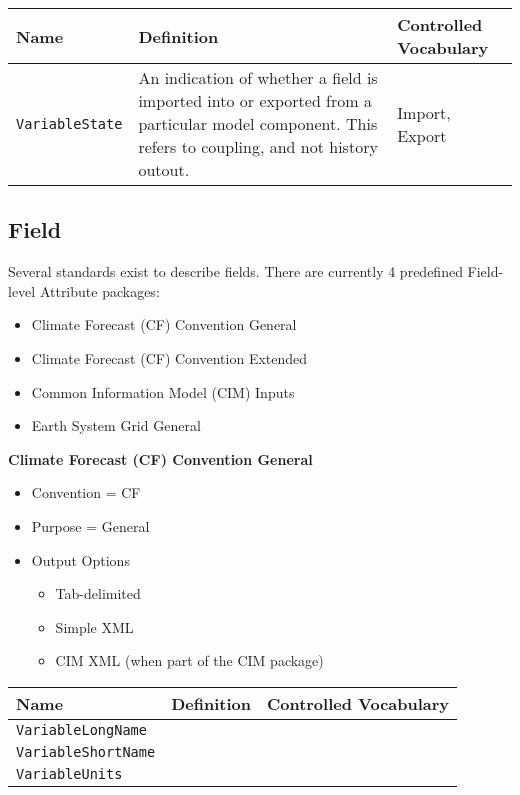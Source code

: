 \begin{tabular}{|p{8cm}|p{20cm}|p{10cm}|}
    {\bf Name } & {\bf Definition} & {\bf Controlled Vocabulary} \\
    \hline\hline
    {\tt VariableState} & An indication of whether a field is imported into or exported from a particular model component. This refers to coupling, and not history outout. & Import, Export \\
\end{tabular}



\subsection{Field}
\label{FieldAttributePackages}

Several standards exist to describe fields. There are currently 4 predefined Field-level Attribute packages:

\begin{itemize}
    \item Climate Forecast (CF) Convention General
    \item Climate Forecast (CF) Convention Extended
    \item Common Information Model (CIM) Inputs
    \item Earth System Grid General

\end{itemize}


{\bf Climate Forecast (CF) Convention General}

\begin{itemize}
    \item Convention = CF
    \item Purpose = General
    \item Output Options
    \begin{itemize}
        \item Tab-delimited
        \item Simple XML
        \item CIM XML (when part of the CIM package)
    \end{itemize} 
\end{itemize}

\begin{tabular}{|p{8cm}|p{20cm}|p{10cm}|}
    {\bf Name } & {\bf Definition} & {\bf Controlled Vocabulary} \\
    \hline\hline
    {\tt VariableLongName} & & \\
    {\tt VariableShortName}  & & \\
    {\tt VariableUnits}  & & \\
\end{tabular}


